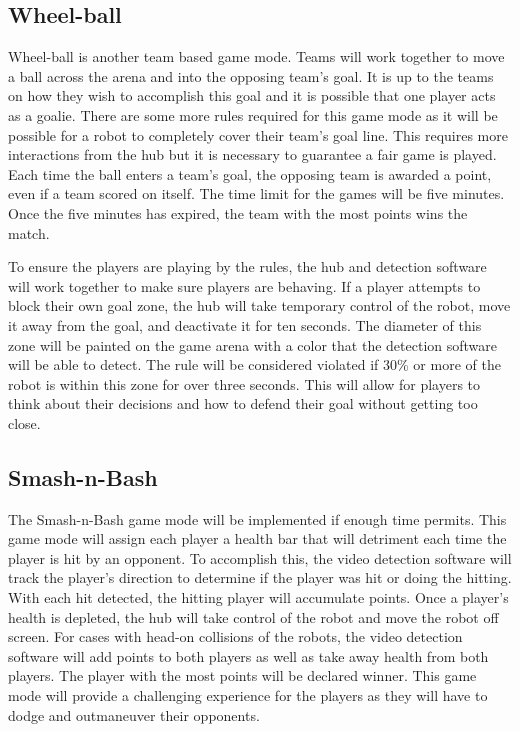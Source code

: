 \documentclass[11pt]{ieeeconf}
\begin{document}
\subsection{Wheel-ball}

Wheel-ball is another team based game mode. Teams will work together to move a ball across the arena and into the opposing team's goal. It is up to the teams on how they wish to accomplish this goal and it is possible that one player acts as a goalie. There are some more rules required for this game mode as it will be possible for a robot to completely cover their team's goal line. This requires more interactions from the hub but it is necessary to guarantee a fair game is played. Each time the ball enters a team's goal, the opposing team is awarded a point, even if a team scored on itself. The time limit for the games will be five minutes. Once the five minutes has expired, the team with the most points wins the match.

To ensure the players are playing by the rules, the hub and detection software will work together to make sure players are behaving. If a player attempts to block their own goal zone, the hub will take temporary control of the robot, move it away from the goal, and deactivate it for ten seconds. The diameter of this zone will be painted on the game arena with a color that the detection software will be able to detect. The rule will be considered violated if 30\% or more of the robot is within this zone for over three seconds. This will allow for players to think about their decisions and how to defend their goal without getting too close. 

\subsection{Smash-n-Bash}

The Smash-n-Bash game mode will be implemented if enough time permits. This game mode will assign each player a health bar that will detriment each time the player is hit by an opponent. To accomplish this, the video detection software will track the player's direction to determine if the player was hit or doing the hitting. With each hit detected, the hitting player will accumulate points. Once a player's health is depleted, the hub will take control of the robot and move the robot off screen. For cases with head-on collisions of the robots, the video detection software will add points to both players as well as take away health from both players. The player with the most points will be declared winner. This game mode will provide a challenging experience for the players as they will have to dodge and outmaneuver their opponents. 
\end{document}
